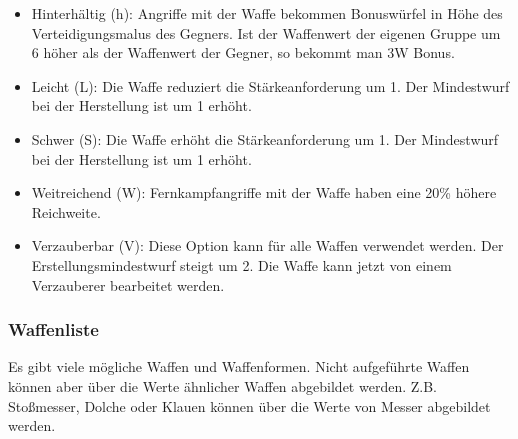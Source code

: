 \documentclass{article}
\begin{document}
\begin{itemize}
\item Hinterhältig (h): Angriffe mit der Waffe bekommen Bonuswürfel in Höhe des Verteidigungsmalus des Gegners. Ist der Waffenwert der eigenen Gruppe um 6 höher als der Waffenwert der Gegner, so bekommt man 3W Bonus.
\item Leicht (L): Die Waffe reduziert die Stärkeanforderung um 1. Der Mindestwurf bei der Herstellung ist um 1 erhöht.
\item Schwer (S): Die Waffe erhöht die Stärkeanforderung um 1. Der Mindestwurf bei der Herstellung ist um 1 erhöht.
\item Weitreichend (W): Fernkampfangriffe mit der Waffe haben eine 20\% höhere Reichweite.
\item Verzauberbar (V): Diese Option kann für alle Waffen verwendet werden. Der Erstellungsmindestwurf steigt um 2. Die Waffe kann jetzt von einem Verzauberer bearbeitet werden.
\end{itemize}

\subsubsection{Waffenliste}

Es gibt viele mögliche Waffen und Waffenformen. Nicht aufgeführte Waffen können aber über die Werte ähnlicher Waffen
abgebildet werden. Z.B. Stoßmesser, Dolche oder Klauen können über die Werte von Messer abgebildet werden.
\end{document}

